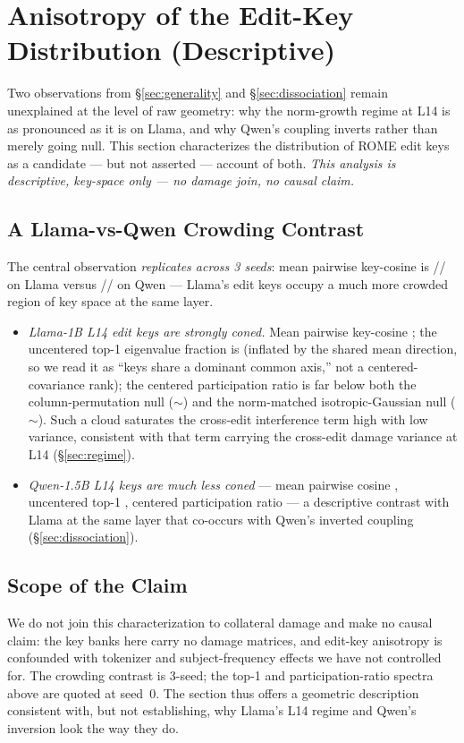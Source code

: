\section{Anisotropy of the Edit-Key Distribution (Descriptive)}
\label{sec:anisotropy}

Two observations from \S\ref{sec:generality} and \S\ref{sec:dissociation}
remain unexplained at the level of raw geometry: why the norm-growth regime at
L14 is as pronounced as it is on Llama, and why Qwen's coupling inverts rather
than merely going null. This section characterizes the distribution of ROME edit
keys as a candidate --- but not asserted --- account of both.
\emph{This analysis is descriptive, key-space only --- no damage join, no
causal claim.}

\subsection{A Llama-vs-Qwen Crowding Contrast}
The central observation \emph{replicates across 3 seeds}: mean pairwise
key-cosine is \aniLlamaMeanCos{}/\aniLlamaMeanCosB{}/\aniLlamaMeanCosC{} on
Llama versus \aniQwenMeanCos{}/\aniQwenMeanCosB{}/\aniQwenMeanCosC{} on Qwen
--- Llama's edit keys occupy a much more crowded region of key space at the
same layer.

\begin{itemize}
\item \emph{Llama-1B L14 edit keys are strongly coned.} Mean pairwise
  key-cosine \aniLlamaMeanCos{}; the uncentered top-1 eigenvalue fraction is
  \aniLlamaTopOne{} (inflated by the shared mean direction, so we read it as
  ``keys share a dominant common axis,'' not a centered-covariance rank); the
  centered participation ratio \aniLlamaPR{} is far below both the
  column-permutation null ($\sim$\aniPermNull{}) and the norm-matched
  isotropic-Gaussian null ($\sim$\aniGaussNull{}). Such a cloud saturates the
  cross-edit interference term high with low variance, consistent with that
  term carrying the cross-edit damage variance at L14 (\S\ref{sec:regime}).
\item \emph{Qwen-1.5B L14 keys are much less coned} --- mean pairwise
  cosine \aniQwenMeanCos{}, uncentered top-1 \aniQwenTopOne{}, centered
  participation ratio \aniQwenPR{} --- a descriptive contrast with Llama at
  the same layer that co-occurs with Qwen's inverted coupling
  (\S\ref{sec:dissociation}).
\end{itemize}

\subsection{Scope of the Claim}
We do not join this characterization to collateral damage and make no causal
claim: the key banks here carry no damage matrices, and edit-key anisotropy is
confounded with tokenizer and subject-frequency effects we have not controlled
for. The crowding contrast is 3-seed; the top-1 and participation-ratio spectra
above are quoted at seed~0. The section thus offers a geometric description
consistent with, but not establishing, why Llama's L14 regime and Qwen's
inversion look the way they do.
